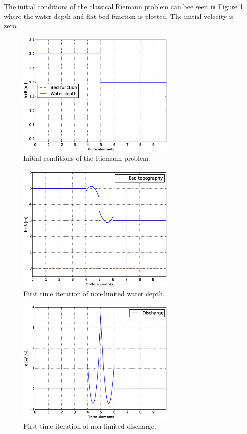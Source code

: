The initial conditions of the classical Riemann problem can bee seen in Figure \ref{riemann} where the water depth and flat bed function is plotted. The initial velocity is zero.
\begin{figure}
\centering
\includegraphics[width=0.7\textwidth]{OBR/riemann.eps}
\caption{Initial conditions of the Riemann problem.}\label{riemann}
\end{figure}
\begin{figure}
\centering
\includegraphics[width=0.7\textwidth]{OBR/first.eps}
\caption{First time iteration of non-limited water depth.}\label{first}
\end{figure}
\begin{figure}
\centering
\includegraphics[width=0.7\textwidth]{OBR/HU.eps}
\caption{First time iteration of non-limited discharge.}\label{HU}
\end{figure}
